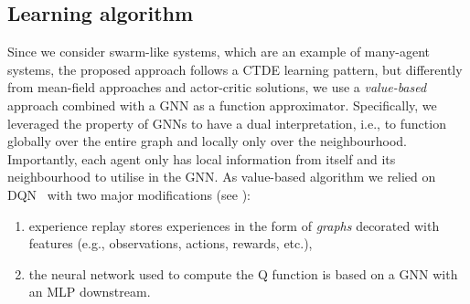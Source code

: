 \documentclass[conference]{IEEEtran}
\begin{document}
\subsection{Learning algorithm}
Since we consider swarm-like systems, which are an example of many-agent systems, 
 the proposed approach follows a \ac{CTDE} learning pattern,
 but differently from mean-field approaches and actor-critic solutions,
 we use a \emph{value-based} approach combined with a \ac{GNN} as a function approximator.
%
%
Specifically, we leveraged the property of \ac{GNN}s to have a dual interpretation, 
i.e., to function globally over the entire graph and locally only over the neighbourhood. 
Importantly, each agent only has local information from itself and its neighbourhood to utilise in the \ac{GNN}.
%
As value-based algorithm we relied on \ac{DQN}~\cite{mnih2015playing} %
with two major modifications (see ): 
\begin{enumerate}
  \item experience replay stores experiences in the form of \emph{graphs} decorated with features (e.g., observations, actions, rewards, etc.),
  \item the neural network used to compute the Q function is based on a \ac{GNN} with an \ac{MLP} downstream.
\end{enumerate}
\end{document}
